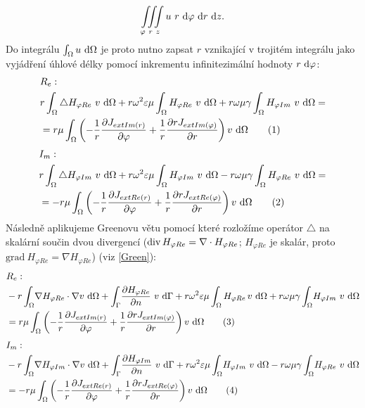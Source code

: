 \documentclass[12pt,a4paper,oneside]{article}
\numberwithin{equation}{section} %
\numberwithin{figure}{section} %
\numberwithin{table}{section} %
\newcommand{\grad}{\mathrm{grad}\ }
\newcommand\numberthis{\addtocounter{equation}{1}\tag{\theequation}}
\begin{document}
\begin{equation}
\iiint \limits_{\varphi ~ r ~ z} u ~ r ~ \mathrm{d} \varphi ~ \mathrm{d} r ~ \mathrm{d} z . 
\end{equation}
Do integrálu $\int _{\Omega} u ~ \mathrm{d} \Omega$ je proto nutno zapsat $r$ vznikající v trojitém integrálu jako vyjádření úhlové délky pomocí inkrementu infinitezimální hodnoty $r ~ \mathrm{d} \varphi$:
\begin{align*}
&R_e:
\\
&r \int _{\Omega} \triangle H _{\varphi Re} ~ v ~ \ud \Omega + r \omega ^2 \varepsilon \mu \int _{\Omega} H _{\varphi Re} ~ v ~ \ud \Omega + r \omega \mu \gamma \int _{\Omega} H _{\varphi Im} ~ v ~ \ud \Omega = 
\\
&= r \mu \int _{\Omega} \left( - \frac{1}{r} \frac{\partial J _{extIm(r)}}{\partial \varphi} + \frac{1}{r} \frac{\partial r J _{extIm(\varphi)}}{\partial r} \right) v ~ \ud \Omega
\numberthis
\end{align*}
\begin{align*}
&I_m:
\\
&r \int _{\Omega} \triangle H _{\varphi Im} ~ v ~ \ud \Omega + r \omega ^2 \varepsilon \mu \int _{\Omega} H _{\varphi Im} ~ v ~ \ud \Omega - r \omega \mu \gamma \int _{\Omega} H _{\varphi Re} ~ v ~ \ud \Omega = 
\\
&= - r \mu \int _{\Omega} \left( - \frac{1}{r} \frac{\partial J _{extRe(r)}}{\partial \varphi} + \frac{1}{r} \frac{\partial r J _{extRe(\varphi)}}{\partial r} \right) v ~ \ud \Omega
\numberthis
\end{align*}
Následně aplikujeme Greenovu větu pomocí které rozložíme operátor $\triangle$ na skalární součin dvou divergencí ($\mathop{\rm div}\nolimits H _{\varphi Re} = \nabla \cdot H _{\varphi Re}$; $H _{\varphi Re}$ je skalár, proto $\grad H _{\varphi Re} = \nabla H _{\varphi Re}$) (viz \ref{Green}):
\begin{align*}
&R_e:
\\
&- r \int _{\Omega} \! \nabla H _{\varphi Re} \cdot \nabla v ~ \ud \Omega + \int _{\Gamma} \! \frac{\partial H _{\varphi Re}}{\partial n} ~ v ~ \ud \Gamma + r \omega ^2 \varepsilon \mu \int _{\Omega} H _{\varphi Re} \! ~ v ~ \ud \Omega + r \omega \mu \gamma \int _{\Omega} \! H _{\varphi Im} ~ v ~ \ud \Omega
\\
&= r \mu \int _{\Omega} \left( - \frac{1}{r} \frac{\partial J _{extIm(r)}}{\partial \varphi} + \frac{1}{r} \frac{\partial r J _{extIm(\varphi)}}{\partial r} \right) v ~ \ud \Omega
\numberthis
\end{align*}
\begin{align*}
&I_m:
\\
&- r \int _{\Omega} \! \nabla H _{\varphi Im} \cdot \nabla v ~ \ud \Omega + \int _{\Gamma} \! \frac{\partial H _{\varphi Im}}{\partial n} ~ v ~ \ud \Gamma + r \omega ^2 \varepsilon \mu \int _{\Omega} \! H _{\varphi Im} ~ v ~ \ud \Omega - r \omega \mu \gamma \int _{\Omega} \! H _{\varphi Re} ~ v ~ \ud \Omega 
\\
&= - r \mu \int _{\Omega} \left( - \frac{1}{r} \frac{\partial J _{extRe(r)}}{\partial \varphi} + \frac{1}{r} \frac{\partial r J _{extRe(\varphi)}}{\partial r} \right) v ~ \ud \Omega
\numberthis
\end{align*}
\end{document}
